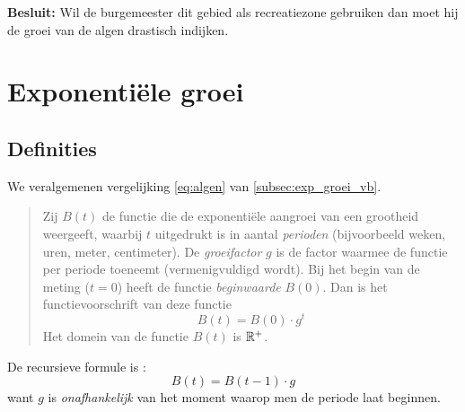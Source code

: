  \noindent
\textbf {Besluit:} Wil de burgemeester dit gebied als recreatiezone gebruiken
 dan moet hij de groei van de algen drastisch indijken.



\newpage
\section{Exponenti\"ele groei}
\subsection{Definities}

We veralgemenen vergelijking \eqref{eq:algen} van \cref{subsec:exp_groei_vb}. 
\begin{quote}

Zij  $B(t)$ de functie die de exponenti\"{e}le
aangroei van een grootheid weergeeft, waarbij $t$ uitgedrukt is in aantal \emph{perioden} (bijvoorbeeld weken, uren, meter, centimeter). De \emph{groeifactor} $g$ is de factor waarmee de functie per periode toeneemt (vermenigvuldigd wordt). Bij het begin van de meting ($t=0$) heeft de functie \emph{beginwaarde} $B(0)$. Dan is het functievoorschrift van deze functie
\begin{equation}
    B(t)=B(0)\cdot g^{t}
    \label{eq:eq_groei2}
\end{equation}
Het domein van de functie $B(t)$ is $\mathbb{R}^+$.

\end{quote}
De recursieve formule is :
\begin{equation}
    B(t)=B(t-1)\cdot g
\end{equation}
want $g$ is \emph{onafhankelijk} van het moment waarop men de periode laat
beginnen.



